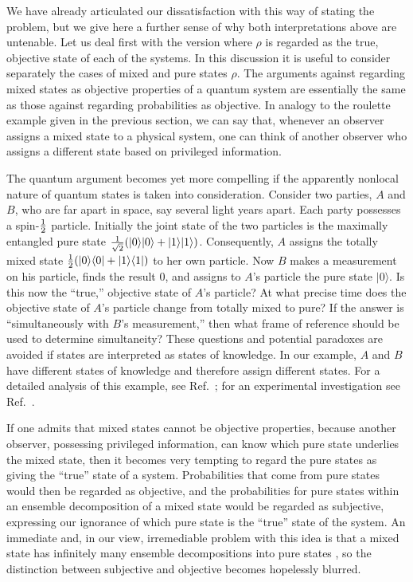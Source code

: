 We have already articulated our dissatisfaction with this way of
stating the problem, but we give here a further sense of why both
interpretations above are untenable.  Let us deal first with the
version where $\rho$ is regarded as the true, objective state of
each of the systems.  In this discussion it is useful to consider
separately the cases of mixed and pure states $\rho$.  The
arguments against regarding mixed states as objective properties
of a quantum system are essentially the same as those against
regarding probabilities as objective. In analogy to the roulette
example given in the previous section, we can say that, whenever
an observer assigns a mixed state to a physical system, one can
think of another observer who assigns a different state based on
privileged information.

The quantum argument becomes yet more compelling if the apparently
nonlocal nature of quantum states is taken into consideration.
Consider two parties, $A$ and $B$, who are far apart in space, say
several light years apart. Each party possesses a spin-$1\over 2$
particle. Initially the joint state of the two particles is the
maximally entangled pure state
${1\over\sqrt2}(|0\rangle|0\rangle+|1\rangle|1\rangle)$.
Consequently, $A$ assigns the totally mixed state
${1\over2}(|0\rangle\langle0|+|1\rangle\langle1|)$ to her own
particle. Now $B$ makes a measurement on his particle, finds the
result 0, and assigns to $A$'s particle the pure state
$|0\rangle$. Is this now the ``true,'' objective state of $A$'s
particle? At what precise time does the objective state of $A$'s
particle change from totally mixed to pure?  If the answer is
``simultaneously with $B$'s measurement,'' then what frame of
reference should be used to determine simultaneity?  These
questions and potential paradoxes are avoided if states are
interpreted as states of knowledge. In our example, $A$ and $B$
have different states of knowledge and therefore assign different
states. For a detailed analysis of this example, see
Ref.~\cite{Peres-9906a}; for an experimental investigation see
Ref.~\cite{Scarani2000}.

If one admits that mixed states cannot be objective properties,
because another observer, possessing privileged information, can
know which pure state underlies the mixed state, then it becomes
very tempting to regard the pure states as giving the ``true''
state of a system.  Probabilities that come from pure states would
then be regarded as objective, and the probabilities for pure
states within an ensemble decomposition of a mixed state would be
regarded as subjective, expressing our ignorance of which pure
state is the ``true'' state of the system.  An immediate and, in
our view, irremediable problem with this idea is that a mixed
state has infinitely many ensemble decompositions into pure states
\cite{Jaynes1957b,Schrodinger1936,Hughston1993}, so the
distinction between subjective and objective becomes hopelessly
blurred.

